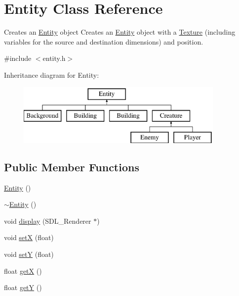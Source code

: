 \hypertarget{class_entity}{\section{Entity Class Reference}
\label{class_entity}
}


Creates an \hyperlink{class_entity}{Entity} object Creates an \hyperlink{class_entity}{Entity} object with a \hyperlink{class_texture}{Texture} (including variables for the source and destination dimensions) and position.  




{\ttfamily \#include $<$entity.\+h$>$}

Inheritance diagram for Entity\+:\begin{figure}[H]
\begin{center}
\leavevmode
\includegraphics[height=3.000000cm]{class_entity}
\end{center}
\end{figure}
\subsection*{Public Member Functions}
\begin{DoxyCompactItemize}
\item 
\hyperlink{class_entity_a980f368aa07ce358583982821533a54a}{Entity} ()
\item 
\hyperlink{class_entity_adf6d3f7cb1b2ba029b6b048a395cc8ae}{$\sim$\+Entity} ()
\item 
void \hyperlink{class_entity_a2224871711ac97a54af338ddefc25ac9}{display} (S\+D\+L\+\_\+\+Renderer $\ast$)
\item 
void \hyperlink{class_entity_a38e2f110d39426ba4823296b4294dd74}{set\+X} (float)
\item 
void \hyperlink{class_entity_a8896110a266bdec69b14d34ec6374df8}{set\+Y} (float)
\item 
float \hyperlink{class_entity_abc5b6d26c039bf3bf6faa766990768b4}{get\+X} ()
\item 
float \hyperlink{class_entity_ab6dd7b404c13754202acfe3d2c65c77b}{get\+Y} ()
\end{DoxyCompactItemize}
